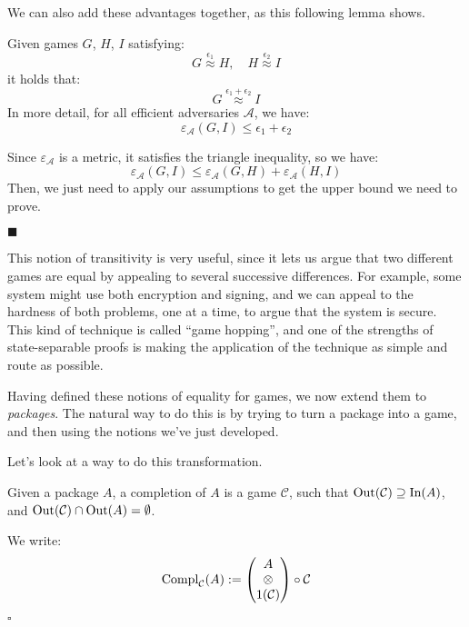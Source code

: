 We can also add these advantages together, as this following
lemma shows.

\begin{lemma}
    Given games $G$, $H$, $I$ satisfying:
    $$
    G \overset{\epsilon_1}{\approx} H, \quad H \overset{\epsilon_2}{\approx} I
    $$
    it holds that:
    $$
    G \overset{\epsilon_1 + \epsilon_2}{\approx} I
    $$
    In more detail, for all efficient adversaries $\mathcal{A}$, we have:
    $$
    \varepsilon_{\mathcal{A}}(G, I) \leq \epsilon_1 + \epsilon_2
    $$

     Since $\varepsilon_{\mathcal{A}}$ is a metric, it
    satisfies the triangle inequality, so we have:
    $$
    \varepsilon_{\mathcal{A}}(G, I) \leq \varepsilon_{\mathcal{A}}(G, H) + \varepsilon_{\mathcal{A}}(H, I)
    $$
    Then, we just need to apply our assumptions to get the upper bound we 
    need to prove.

    $\blacksquare$
\end{lemma}

This notion of transitivity is very useful, since it lets us argue
that two different games are equal by appealing to several successive
differences.
For example, some system might use both encryption and signing,
and we can appeal to the hardness of both problems, one at a time,
to argue that the system is secure.
This kind of technique is called ``game hopping'',
and one of the strengths of state-separable proofs is making
the application of the technique as simple and route as possible.

Having defined these notions of equality for games,
we now extend them to \emph{packages}.
The natural way to do this is by trying to turn
a package into a game, and then using the notions we've just developed.

Let's look at a way to do this transformation.

\begin{definition}[Completion]
    Given a package $A$, a completion of $A$ is a game $\mathcal{C}$,
    such that $\text{Out}(\mathcal{C}) \supseteq \text{In}(A)$,
    and $\text{Out}(\mathcal{C}) \cap \text{Out}(A) = \emptyset$.

    We write:
    $$
    \text{Compl}_{\mathcal{C}}(A) := \begin{pmatrix}
        A\cr
        \otimes\cr
        1(\mathcal{C})
    \end{pmatrix}
    \circ \mathcal{C}
    $$

    $\square$
\end{definition}

